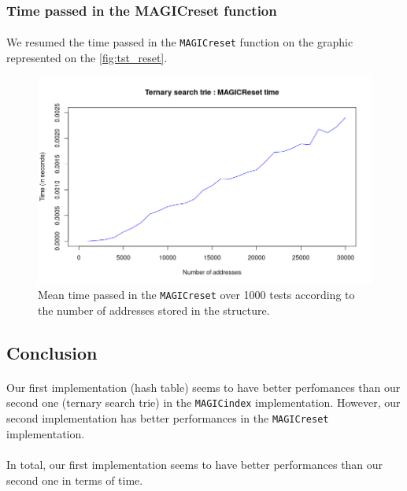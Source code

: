 \documentclass[a4paper, 11pt, oneside]{article}
\begin{document}
\subsubsection{Time passed in the MAGICreset function}
\paragraph{}We resumed the time passed in the \texttt{MAGICreset} function on the graphic represented on the \autoref{fig:tst_reset}. 
\begin{figure}[H]
  \centering
  \includegraphics[scale=0.6]{plots/tst_reset.png} 
  \caption{Mean time passed in the \texttt{MAGICreset} over 1000 tests according to the number of addresses stored in the structure.}\label{fig:tst_reset}
\end{figure}

\subsection{Conclusion}
\paragraph{}Our first implementation (hash table) seems to have better perfomances than our second one (ternary search trie) in the \texttt{MAGICindex} implementation. However, our second implementation
has better performances in the \texttt{MAGICreset} implementation.

\paragraph{}In total, our first implementation seems to have better performances than our second one in terms of time.
\end{document}
